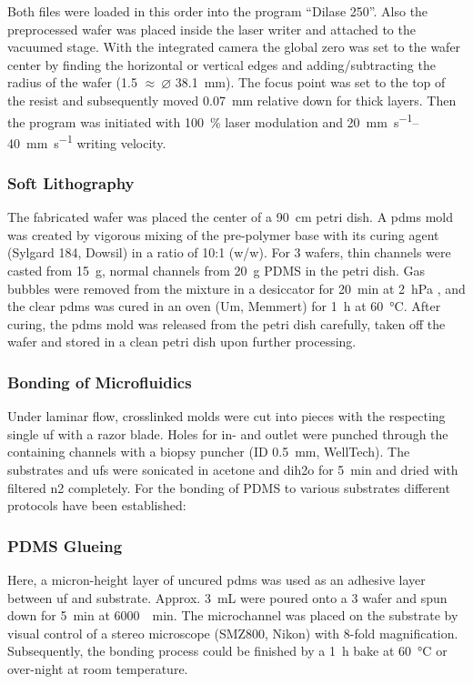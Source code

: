 Both files were loaded in this order into the program ``Dilase 250''. Also the preprocessed wafer was placed inside the laser writer and attached to the vacuumed stage. With the integrated camera the global zero was set to the wafer center by finding the horizontal or vertical edges and adding/subtracting the radius of the wafer (\SI{1.5}{\inch} $\approx\ \varnothing $  \SI{38.1}{\milli\meter}). The focus point was set to the top of the resist and subsequently moved \SI{.07}{\milli\meter} relative down for thick layers. Then the program was initiated with \SI{100}{\percent} laser modulation and \SIrange{20}{40}{\milli\meter\per\second} writing velocity.

\subsubsection{Soft Lithography}
The fabricated wafer was placed the center of a \SI{90}{\centi\meter} petri dish. A \gls{pdms} mold was created by vigorous mixing of the pre-polymer base with its curing agent (Sylgard 184, Dowsil) in a ratio of 10:1 (w/w). For \SI{3}{\inch} wafers, thin channels were casted from \SI{15}{\gram}, normal channels from \SI{20}{\gram} PDMS in the petri dish. Gas bubbles were removed from the mixture in a desiccator for \SI{20}{\minute} at \SI{2}{\hecto\pascal} , and the clear \gls{pdms} was cured in an oven (Um, Memmert) for \SI{1}{\hour} at \SI{60}{\degreeCelsius}. After curing, the \gls{pdms} mold was released from the petri dish carefully, taken off the wafer and stored in a clean petri dish upon further processing.  

\subsubsection{Bonding of Microfluidics}
Under laminar flow, crosslinked molds were cut into pieces with the respecting single \gls{uf} with a razor blade. Holes for in- and outlet were punched through the containing channels with a biopsy puncher (ID \SI{0.5}{\milli\meter}, WellTech). The substrates and \glspl{uf} were sonicated in acetone and \gls{dih2o} for \SI{5}{\minute} and dried with filtered \gls{n2} completely. For the bonding of PDMS to various substrates different protocols have been established:

\subsubsection{PDMS Glueing}
\label{sec:meth:bond:glue}
Here, a micron-height layer of uncured \gls{pdms} was used as an adhesive layer between \gls{uf} and substrate. Approx. \SI{3}{\milli\liter} were poured onto a \SI{3}{\inch} wafer and spun down for \SI{5}{\minute} at \SI{6000}{\per\minute}. The microchannel was placed on the substrate by visual control of a stereo microscope (SMZ800, Nikon) with 8-fold magnification. Subsequently, the bonding process could be finished by a \SI{1}{\hour} bake at \SI{60}{\degreeCelsius} or over-night at room temperature.
